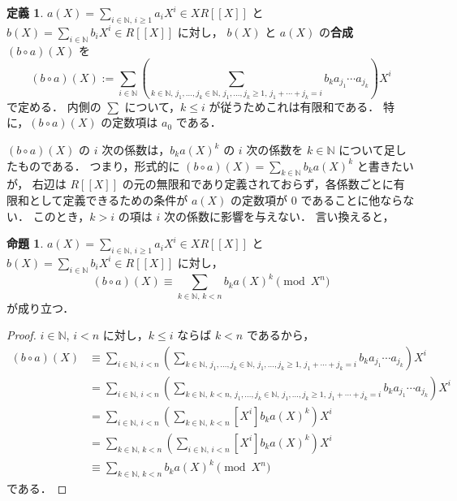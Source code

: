 \documentclass{jsarticle}
\newcommand{\N}{\mathbb{N}}
\theoremstyle{definition}
\newtheorem*{Dfn}{定義}
\newtheorem{Prp}{命題}
\newenvironment{dfn}{\vspace{1ex}\begin{screen}\begin{Dfn}}{\end{Dfn}\end{screen}\vspace{1ex}}
\newenvironment{prp}{\vspace{1ex}\begin{screen}\begin{Prp}}{\end{Prp}\end{screen}}
\newenvironment{prf}{\begin{leftbar}\begin{proof}}{\end{proof}\end{leftbar}}
\begin{document}
\begin{dfn}
  $a(X) = \sum_{i\in\N,\,i\ge 1} a_i X^i \in X R[[X]]$ と
  $b(X) = \sum_{i\in\N} b_i X^i \in R[[X]]$ に対し，
  $b(X)$ と $a(X)$ の\textbf{合成} $(b \circ a)(X)$ を
  \[
    (b \circ a)(X) := \sum_{i\in\N} \left(\sum_{k\in\N,\, j_1,\ldots,j_k\in\N,\, j_1,\ldots,j_k\ge 1,\, j_1+\cdots+j_k=i} b_k a_{j_1} \cdots a_{j_k} \right) X^i
  \]
  で定める．
  内側の $\sum$ について，$k \le i$ が従うためこれは有限和である．
  特に，$(b \circ a)(X)$ の定数項は $a_0$ である．
\end{dfn}

$(b \circ a)(X)$ の $i$ 次の係数は，$b_k a(X)^k$ の $i$ 次の係数を $k \in \N$ について足したものである．
つまり，形式的に $(b \circ a)(X) = \sum_{k\in\N} b_k a(X)^k$ と書きたいが，
右辺は $R[[X]]$ の元の無限和であり定義されておらず，各係数ごとに有限和として定義できるための条件が $a(X)$ の定数項が $0$ であることに他ならない．
このとき，$k > i$ の項は $i$ 次の係数に影響を与えない．
言い換えると，
\begin{prp}
  \label{prp:composition-mod}
  $a(X) = \sum_{i\in\N,\,i\ge 1} a_i X^i \in X R[[X]]$ と
  $b(X) = \sum_{i\in\N} b_i X^i \in R[[X]]$ に対し，
  \[
    (b \circ a)(X) \equiv \sum_{k\in\N,\,k<n} b_k a(X)^k \pmod{X^n}
  \]
  が成り立つ．
\end{prp}
\begin{prf}
  $i \in \N$, $i < n$ に対し，$k \le i$ ならば $k < n$ であるから，
  \begin{align*}
    (b \circ a)(X)
    &\equiv \sum_{i\in\N,\,i<n} \left(\sum_{k\in\N,\, j_1,\ldots,j_k\in\N,\, j_1,\ldots,j_k\ge 1,\, j_1+\cdots+j_k=i} b_k a_{j_1} \cdots a_{j_k} \right) X^i \\
    &= \sum_{i\in\N,\,i<n} \left(\sum_{k\in\N,\, k<n,\, j_1,\ldots,j_k\in\N,\, j_1,\ldots,j_k\ge 1,\, j_1+\cdots+j_k=i} b_k a_{j_1} \cdots a_{j_k} \right) X^i \\
    &= \sum_{i\in\N,\,i<n} \left( \sum_{k\in\N,\,k<n} [X^i] b_k a(X)^k \right) X^i \\
    &= \sum_{k\in\N,\,k<n} \left( \sum_{i\in\N,\,i<n} [X^i] b_k a(X)^k \right) X^i \\
    &\equiv \sum_{k\in\N,\,k<n} b_k a(X)^k \pmod{X^n}
  \end{align*}
  である．
\end{prf}
\end{document}
